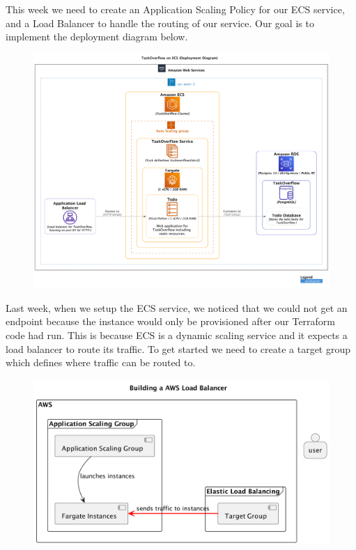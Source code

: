 \documentclass{csse4400}
\begin{document}
This week we need to create an Application Scaling Policy for our ECS service,
and a Load Balancer to handle the routing of our service.
Our goal is to implement the deployment diagram below.

\begin{figure}[H]
  \includegraphics[trim=0 230 0 0,clip,width=\textwidth]{diagrams/ecsdeployment}
\end{figure}

Last week, when we setup the ECS service, we noticed that we could not get an endpoint because the instance would only be provisioned after our Terraform code had run.
This is because ECS is a dynamic scaling service and it expects a load balancer to route its traffic.
To get started we need to create a target group which defines where traffic can be routed to.

\begin{figure}[H]
  \begin{center}
    \includegraphics[scale=0.2]{diagrams/lb2fargate}
  \end{center}
\end{figure}
\end{document}
